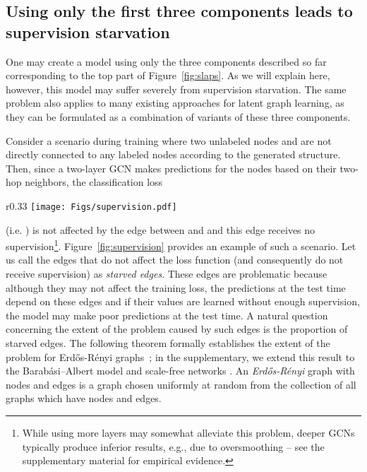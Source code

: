 \documentclass{article}
\begin{document}
\subsection{Using only the first three components leads to supervision starvation} \label{sec:3comp}
One may create a model using only the three components described so far corresponding to the top part of Figure~\ref{fig:slaps}. As we will explain here, however, this model may suffer severely from supervision starvation. The same problem also applies to many existing approaches for latent graph learning, as they can be formulated as a combination of variants of these three components.

Consider a scenario during training where two unlabeled nodes  and  are not directly connected to any labeled nodes according to the generated structure. Then, since a two-layer GCN makes predictions for the nodes based on their two-hop neighbors, the classification loss 
\begin{wrapfigure}{r}{0.33\columnwidth}
    \centering
    \texttt{[image: Figs/supervision.pdf]}
    \caption{Using a two-layer GCN, the predictions made for the labeled nodes are not affected by the dashed (starved) edge.
    \label{fig:supervision}}
\end{wrapfigure}
(i.e. ) is not affected by the edge between  and  and this edge receives no supervision\footnote{While using more layers may somewhat alleviate this problem, deeper GCNs typically produce inferior results, e.g., due to oversmoothing \citep[][]{li2018deeper,oono2020graph} -- see the supplementary material for empirical evidence.}.
Figure~\ref{fig:supervision} provides an example of such a scenario.
Let us call the edges that do not affect the loss function  (and consequently do not receive supervision) as \emph{starved edges}. These edges are problematic because although they may not affect the training loss, the predictions at the test time depend on these edges and if their values are learned without enough supervision, the model may make poor predictions at the test time. 
A natural question concerning the extent of the problem caused by such edges is the proportion of starved edges. The following theorem formally establishes the extent of the problem for Erd\H{o}s-R\'enyi graphs~\cite{erdos1959}; in the supplementary, we extend this result to the Barabási–Albert model \cite{albert2002statistical} and scale-free networks \cite{barabasi1999emergence}. An \emph{Erd\H{o}s-R\'enyi} graph with  nodes and  edges is a graph chosen uniformly at random from the collection of all graphs which have  nodes and  edges.
\end{document}
